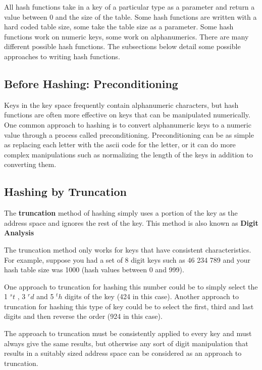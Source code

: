 All hash functions take in a key of a particular type as a parameter and return a value between 0 and the size of the table.   Some hash functions are written with a hard coded table size,  some take the table size as a parameter.  Some hash functions work on numeric keys,  some work on alphanumerics.   There are many different possible hash functions.  The subsections below detail some possible approaches to writing hash functions.

\subsection{Before Hashing: Preconditioning}

     Keys in the key space frequently contain alphanumeric characters, but hash functions are often more effective on keys that can be manipulated numerically. One common approach to hashing is to convert alphanumeric keys to a numeric value through a process called preconditioning. Preconditioning can be as simple as replacing each letter with the ascii code for the  letter, or it can do more complex manipulations such as normalizing the length of the keys in addition to converting them. 
   
\subsection{ Hashing by Truncation}

    The \textbf{truncation} method of hashing simply uses a portion of the key as the 
       address space and ignores the rest of the key.  This method is also known as \textbf{Digit Analysis}
       

     The truncation method only works for keys that have consistent characteristics.  For example, suppose you had a set of 8 digit keys such as 46 234 789 and your hash table size was 1000 (hash values between 0 and 999).
     
     One approach to truncation for hashing this number could be to simply select the 1 $^st$ , 3 $^rd$ and 5 $^th$ digits of the key (424 in this case). Another approach to truncation for hashing this type of key could be to select the first, third and last digits and then reverse the order (924 in this case).
     
The approach to truncation must be consistently applied to every key and must always give the same results, but otherwise any sort of digit manipulation that results in a suitably sized address space can be considered as an approach to truncation.

